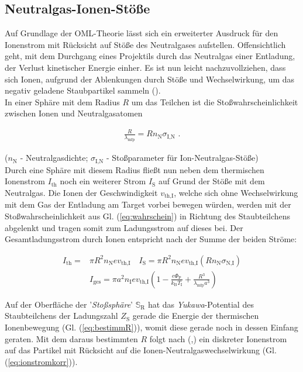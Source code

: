 \documentclass[numbers=noenddot,a4paper,notitlepage,twoside,BCOR15mm]{scrbook}
\newcommand{\ix}[1]{_\text{#1}}
\newcommand{\tilt}[1]{\textit{#1}}
\begin{document}
			\subsection{Neutralgas-Ionen-Stöße}

			Auf Grundlage der OML-Theorie lässt sich ein erweiterter Ausdruck für den Ionenstrom mit Rücksicht auf Stöße des Neutralgases aufstellen. Offensichtlich geht, mit dem Durchgang eines Projektils durch das Neutralgas einer Entladung, der Verlust kinetischer Energie einher. Es ist nun leicht nachzuvollziehen, dass sich Ionen, aufgrund der Ablenkungen durch Stöße und Wechselwirkung, um das negativ geladene Staubpartikel sammeln (\cite{Goree92}).\\
            In einer Sphäre mit dem Radius $R$ um das Teilchen ist die Stoßwahrscheinlichkeit zwischen Ionen und Neutralgasatomen

				\begin{align}
					\frac{R}{\lambda\ix{mfp}}=Rn\ix{N}\sigma\ix{I,N} \,\, . \label{eq:wahrschein}
				\end{align}

			($n\ix{N}$ - Neutralgasdichte; $\sigma\ix{I,N}$ - Stoßparameter für Ion-Neutralgas-Stöße)\\
			Durch eine Sph\"are mit diesem Radius flie{\ss}t nun neben dem thermischen Ionenstrom $I\ix{th}$ noch ein weiterer Strom $I\ix{S}$ auf Grund der St\"o{\ss}e mit dem Neutralgas. Die Ionen der Geschwindigkeit $v\ix{th,I}$, welche sich ohne Wechselwirkung mit dem Gas der Entladung am Target vorbei bewegen w\"urden, werden mit der Sto{\ss}wahrscheinlichkeit aus Gl. (\ref{eq:wahrschein}) in Richtung des Staubteilchens abgelenkt und tragen somit zum Ladungsstrom auf dieses bei. Der Gesamtladungsstrom durch Ionen entspricht nach \cite{Lampe01} der Summe der beiden Str\"ome:

				\begin{align}
					I\ix{th}=&\pi R^{2}n\ix{N}ev\ix{th,I} \quad I\ix{S}=\pi R^2n\ix{N}ev\ix{th,I}\left(Rn\ix{N}\sigma\ix{N,I}\right) \\
					&I\ix{ges}=\pi a^{2}n\ix{I}ev\ix{th,I}\left(1-\frac{e\Phi\ix{P}}{k\ix{B}T\ix{I}}+\frac{R^{3}}{\lambda\ix{mfp}a^{3}}\right)
				\end{align}

			Auf der Oberfl\"ache der '\tilt{Sto{\ss}sph\"are}' $\mathbb{S}\ix{R}$ hat das \tilt{Yukawa}-Potential des Staubteilchens der Ladungszahl $Z\ix{S}$ gerade die Energie der thermischen Ionenbewegung (Gl. (\ref{eq:bestimmR})), womit diese gerade noch in dessen Einfang geraten. Mit dem daraus bestimmten $R$ folgt nach (\cite{Melzer12},\cite{Khrapak05a}) ein diskreter Ionenstrom auf das Partikel mit R\"ucksicht auf die Ionen-Neutralgaswechselwirkung (Gl. (\ref{eq:ionstromkorr})).
\end{document}
